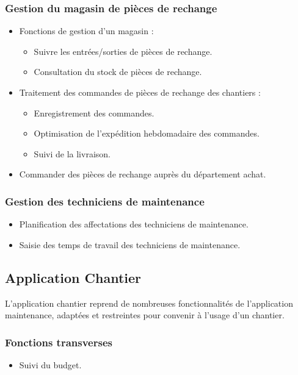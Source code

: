 \subsubsection{Gestion du magasin de pièces de rechange}
\begin{itemize}
\item Fonctions de gestion d'un magasin :
    \begin{itemize}
    \item Suivre les entrées/sorties de pièces de rechange.
    \item Consultation du stock de pièces de rechange.
    \end{itemize}
\item Traitement des commandes de pièces de rechange des chantiers :
    \begin{itemize}
    \item Enregistrement des commandes.
    \item Optimisation de l'expédition hebdomadaire des commandes.
    \item Suivi de la livraison.
    \end{itemize}
\item Commander des pièces de rechange auprès du département achat.
\end{itemize}

\subsubsection{Gestion des techniciens de maintenance}
\begin{itemize}
\item Planification des affectations des techniciens de maintenance.
\item Saisie des temps de travail des techniciens de maintenance.
\end{itemize}


\subsection{Application Chantier}
L'application chantier reprend de nombreuses fonctionnalités de
l'application maintenance, adaptées et restreintes pour convenir à l'usage
d'un chantier.

\subsubsection{Fonctions transverses}
\begin{itemize}
\item Suivi du budget.
\end{itemize}

